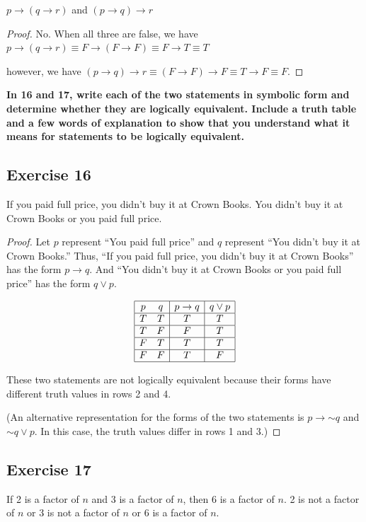 \documentclass[14pt]{extarticle}
\begin{document}
$p \to (q \to r)$ and $(p \to q) \to r$

\begin{proof} No. When all three are false, we have
$p \to (q \to r) \equiv F \to (F \to F) \equiv F \to T \equiv T$

however, we have $(p \to q) \to r \equiv (F \to F) \to F \equiv T \to F \equiv
F$. \end{proof}

{\bf In 16 and 17, write each of the two statements in symbolic form and
determine whether they are logically equivalent. Include a truth table and a few
words of explanation to show that you understand what it means for statements to
be logically equivalent.}

\subsection{Exercise 16} If you paid full price, you didn’t buy it at Crown
Books. You didn’t buy it at Crown Books or you paid full price.

\begin{proof} Let $p$ represent “You paid full price” and $q$ represent “You
didn’t buy it at Crown Books.” Thus, “If you paid full price, you didn’t buy it
at Crown Books” has the form $p \to q$. And “You didn’t buy it at Crown Books or
you paid full price” has the form $q \vee p$.

$$ \begin{array}{|cc|c|c|} \hline p & q & p \to q & q \vee p \\ \hline T & T & T
& T \\ \hline T & F & F & T \\ \hline F & T & T & T \\ \hline F & F & T & F \\
\hline \end{array} $$

These two statements are not logically equivalent because their forms have
different truth values in rows 2 and 4.

(An alternative representation for the forms of the two statements is $p \to
{\sim q}$ and ${\sim q} \vee p$. In this case, the truth values differ in rows 1
and 3.) \end{proof}

\subsection{Exercise 17} If 2 is a factor of $n$ and 3 is a factor of $n$, then
6 is a factor of $n$. 2 is not a factor of $n$ or 3 is not a factor of $n$ or 6
is a factor of $n$.
\end{document}
